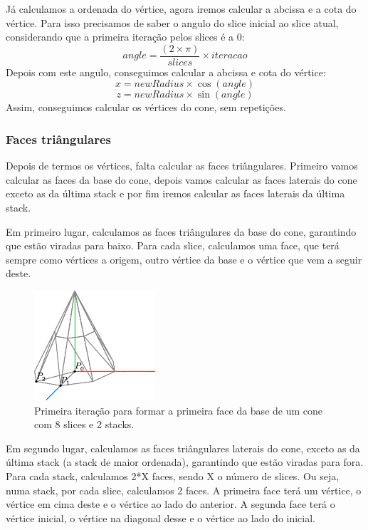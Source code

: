 \documentclass[12pt, a4paper]{article}
\begin{document}
Já calculamos a ordenada do vértice, agora iremos calcular a abcissa e a cota do
vértice. Para isso precisamos de saber o angulo do slice inicial ao slice atual,
considerando que a primeira iteração pelos slices é a 0:
$$
angle = \frac{(2 \times \pi)}{slices}\times iteracao
$$
Depois com este angulo, conseguimos calcular a abcissa e cota do vértice:
$$
x = newRadius \times \cos(angle)
$$
$$
z = newRadius \times \sin(angle)
$$
Assim, conseguimos calcular os vértices do cone, sem repetições.

\subsubsection{Faces triângulares}

Depois de termos os vértices, falta calcular as faces triângulares. Primeiro vamos calcular
as faces da base do cone, depois vamos calcular as faces laterais do cone exceto as da
última stack e por fim iremos calcular as faces laterais da última stack.

Em primeiro lugar, calculamos as faces triângulares da base do cone, garantindo que estão viradas
para baixo. Para cada slice, calculamos uma face, que terá sempre como vértices a origem,
outro vértice da base e o vértice que vem a seguir deste.

\begin{figure}[H]
    \centering
    \includegraphics[width=0.4\textwidth]{res/figures/Cone3.pdf}
    \caption{
        Primeira iteração para formar a primeira face da base de um cone com 8 slices e 2 stacks.
    }
\end{figure}

Em segundo lugar, calculamos as faces triângulares laterais do cone, exceto as da última stack
(a stack de maior ordenada), garantindo que estão viradas para fora. Para cada stack, calculamos
2*X faces, sendo X o número de slices. Ou seja, numa stack, por cada slice, calculamos 2 faces.
A primeira face terá um vértice, o vértice em cima deste e o vértice ao lado do anterior.
A segunda face terá o vértice inicial, o vértice na diagonal desse e o vértice ao lado do
inicial.
\end{document}
